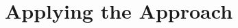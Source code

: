 \documentclass[12pt,oneside]{book}
\begin{document}
\newpage\ 




\newpage \ \newpage \ 
\part{Applying the Approach}
\label{part3}
\newpage\ 















	
	
\end{document}
